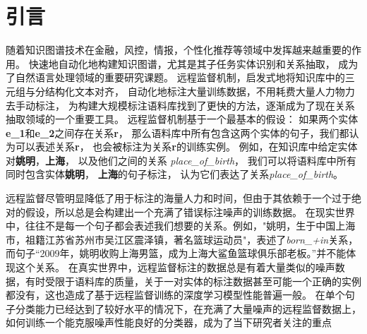 \documentclass[UTF8]{csoarticle}
\begin{document}




\maketitle



\section{引言}
随着知识图谱技术在金融，风控，情报，个性化推荐等领域中发挥越来越重要的作用。
快速地自动化地构建知识图谱，尤其是其子任务实体识别和关系抽取，
成为了自然语言处理领域的重要研究课题。
远程监督机制，启发式地将知识库中的三元组与分结构化文本对齐，
自动化地标注大量训练数据，不用耗费大量人力物力去手动标注，
为构建大规模标注语料库找到了更快的方法，逐渐成为了现在关系抽取领域的一个重要工具。
远程监督机制基于一个最基本的假设：
如果两个实体\textbf{e\_1}和\textbf{e\_2}之间存在关系\textbf{r}，
那么语料库中所有包含这两个实体的句子，我们都认为可以表述关系\textbf{r}，
也会被标注为关系\textbf{r}的训练实例。
例如，在知识库中给定实体对\textbf{姚明}，\textbf{上海}，
以及他们之间的关系 \textit{place\_of\_birth}，
我们可以将语料库中所有同时包含实体\textbf{姚明}， \textbf{上海}的句子标注，
认为它们表达了关系\textit{place\_of\_birth}。

远程监督尽管明显降低了用于标注的海量人力和时间，但由于其依赖于一个过于绝对的假设，所以总是会构建出一个充满了错误标注噪声的训练数据。
在现实世界中，往往不是每一个句子都会表述我们想要的关系。例如，"姚明，生于中国上海市，祖籍江苏省苏州市吴江区震泽镇，著名篮球运动员"，表述了\textit{born\_+in}关系，
而句子“2009年，姚明收购上海男篮，成为上海大鲨鱼篮球俱乐部老板。”并不能体现这个关系。
在真实世界中，远程监督标注的数据总是有着大量类似的噪声数据，有时受限于语料库的质量，关于一对实体的标注数据甚至可能一个正确的实例都没有，这也造成了基于远程监督训练的深度学习模型性能普遍一般。
在单个句子分类能力已经达到了较好水平的情况下，在充满了大量噪声的远程监督数据上，如何训练一个能克服噪声性能良好的分类器，成为了当下研究者关注的重点
\end{document}
